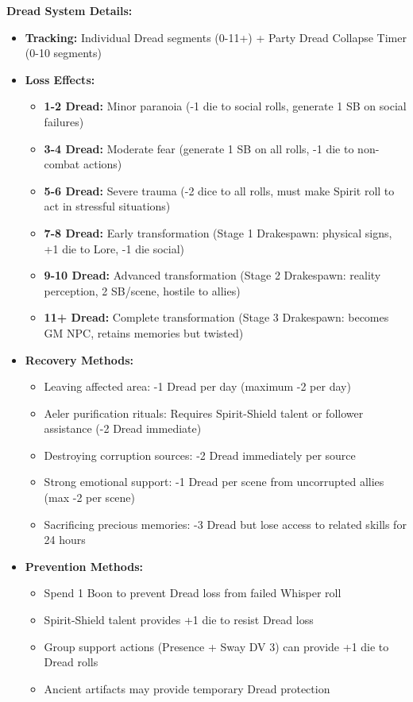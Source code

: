 \documentclass[11pt]{article}
\begin{document}
\textbf{Dread System Details:}
\begin{itemize}
\item \textbf{Tracking:} Individual Dread segments (0-11+) + Party Dread Collapse Timer (0-10 segments)
\item \textbf{Loss Effects:}
  \begin{itemize}
  \item \textbf{1-2 Dread:} Minor paranoia (-1 die to social rolls, generate 1 SB on social failures)
  \item \textbf{3-4 Dread:} Moderate fear (generate 1 SB on all rolls, -1 die to non-combat actions)
  \item \textbf{5-6 Dread:} Severe trauma (-2 dice to all rolls, must make Spirit roll to act in stressful situations)
  \item \textbf{7-8 Dread:} Early transformation (Stage 1 Drakespawn: physical signs, +1 die to Lore, -1 die social)
  \item \textbf{9-10 Dread:} Advanced transformation (Stage 2 Drakespawn: reality perception, 2 SB/scene, hostile to allies)
  \item \textbf{11+ Dread:} Complete transformation (Stage 3 Drakespawn: becomes GM NPC, retains memories but twisted)
  \end{itemize}
\item \textbf{Recovery Methods:}
  \begin{itemize}
  \item Leaving affected area: -1 Dread per day (maximum -2 per day)
  \item Aeler purification rituals: Requires Spirit-Shield talent or follower assistance (-2 Dread immediate)
  \item Destroying corruption sources: -2 Dread immediately per source
  \item Strong emotional support: -1 Dread per scene from uncorrupted allies (max -2 per scene)
  \item Sacrificing precious memories: -3 Dread but lose access to related skills for 24 hours
  \end{itemize}
\item \textbf{Prevention Methods:}
  \begin{itemize}
  \item Spend 1 Boon to prevent Dread loss from failed Whisper roll
  \item Spirit-Shield talent provides +1 die to resist Dread loss
  \item Group support actions (Presence + Sway DV 3) can provide +1 die to Dread rolls
  \item Ancient artifacts may provide temporary Dread protection
  \end{itemize}
\end{itemize}
\end{document}
